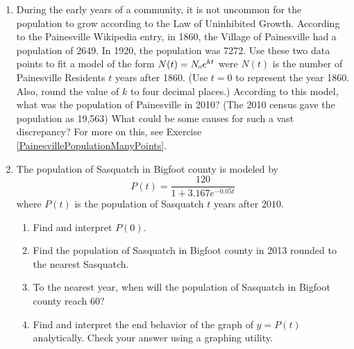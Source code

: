 \begin{enumerate}
\item  \label{PainesvillePopulationTwoPoint} During the early years of a community, it is not uncommon for the population to grow according to the Law of Uninhibited Growth.  According to the Painesville Wikipedia entry, in 1860, the Village of Painesville had a population of 2649.  In 1920, the population was 7272.  Use these two data points to fit a model of the form $N(t) = N_{\text{\tiny $0$}} e^{kt}$ were $N(t)$ is the number of Painesville Residents $t$ years after 1860.  (Use $t = 0$ to represent the year 1860.  Also, round the value of $k$ to four decimal places.)  According to this model, what was the population of Painesville in 2010?  (The 2010 census gave the population as 19,563) What could be some causes for such a vast discrepancy?  For more on this, see Exercise \ref{PainesvillePopulationManyPoints}.

\item  The population of Sasquatch in Bigfoot county is modeled by \[P(t) = \dfrac{120}{1 + 3.167e^{-0.05t}}\] where $P(t)$ is the population of Sasquatch $t$ years after $2010$.

\begin{enumerate}

\item  Find and interpret $P(0)$.

\item  Find the population of Sasquatch in Bigfoot county in 2013 rounded to the nearest Sasquatch.

\item  To the nearest year, when will the population of Sasquatch in Bigfoot county reach 60?  

\item   Find and interpret the end behavior of the graph of $y = P(t)$ analytically. Check your answer using a graphing utility. 

\end{enumerate}

\setcounter{HW}{\value{enumi}}
\end{enumerate}


